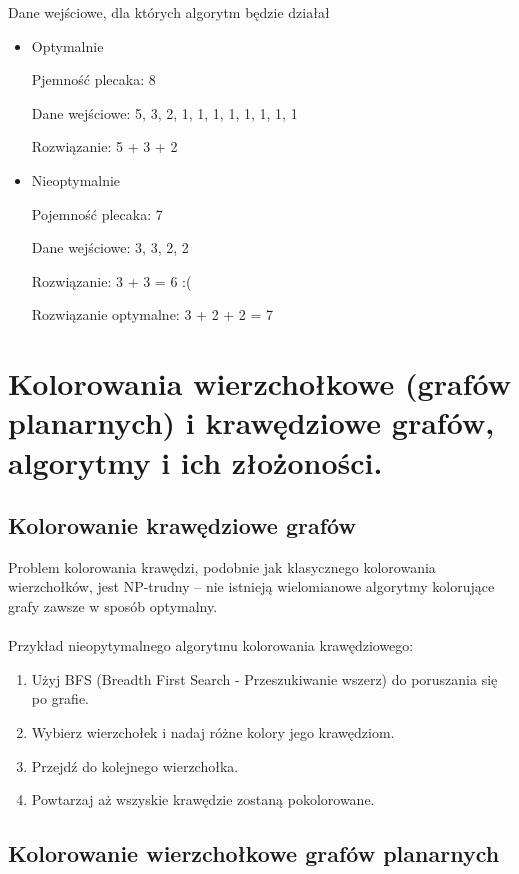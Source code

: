 \documentclass[12pt]{article}
\begin{document}
    Dane wejściowe, dla których algorytm będzie działał
    \begin{itemize}
        \item Optymalnie

        Pjemność plecaka: 8

        Dane wejściowe: 5, 3, 2, 1, 1, 1, 1, 1, 1, 1, 1

        Rozwiązanie: 5 + 3 + 2

        \item Nieoptymalnie

        Pojemność plecaka: 7

        Dane wejściowe: 3, 3, 2, 2

        Rozwiązanie: 3 + 3 = 6 :(

        Rozwiązanie optymalne: 3 + 2 + 2 = 7

    \end{itemize}

    \newpage

    \section{Kolorowania wierzchołkowe (grafów planarnych) i krawędziowe grafów, algorytmy i ich złożoności.}

    \subsection{Kolorowanie krawędziowe grafów}
    Problem kolorowania krawędzi, podobnie jak klasycznego kolorowania wierzchołków, jest NP-trudny – nie istnieją wielomianowe algorytmy kolorujące grafy zawsze w sposób optymalny.
    \\\\
    Przykład nieopytymalnego algorytmu kolorowania krawędziowego:
    \begin{enumerate}
        \item Użyj BFS (Breadth First Search - Przeszukiwanie wszerz) do poruszania się po grafie.
        \item Wybierz wierzchołek i nadaj różne kolory jego krawędziom.
        \item Przejdź do kolejnego wierzchołka.
        \item Powtarzaj aż wszyskie krawędzie zostaną pokolorowane.
    \end{enumerate}

    \subsection{Kolorowanie wierzchołkowe grafów planarnych}
\end{document}
